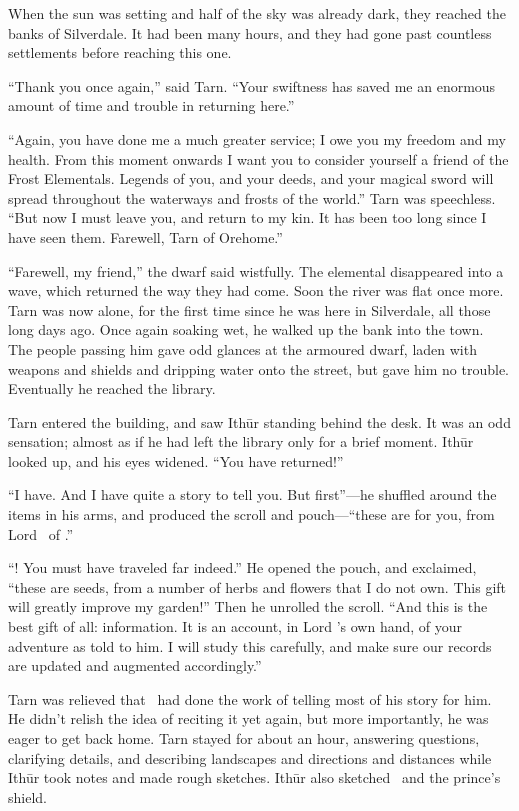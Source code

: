 When the sun was setting and half of the sky was already dark, they reached the banks of Silverdale.  It had been many hours, and they had gone past countless settlements before reaching this one.

``Thank you once again,'' said Tarn.  ``Your swiftness has saved me an enormous amount of time and trouble in returning here.''

``Again, you have done me a much greater service; I owe you my freedom and my health.  From this moment onwards I want you to consider yourself a friend of the Frost Elementals.  Legends of you, and your deeds, and your magical sword will spread throughout the waterways and frosts of the world.''  Tarn was speechless.  ``But now I must leave you, and return to my kin.  It has been too long since I have seen them.  Farewell, Tarn of Orehome.''

``Farewell, my friend,'' the dwarf said wistfully.  The elemental disappeared into a wave, which returned the way they had come.  Soon the river was flat once more.  Tarn was now alone, for the first time since he was here in Silverdale, all those long days ago.  Once again soaking wet, he walked up the bank into the town.  The people passing him gave odd glances at the armoured dwarf, laden with weapons and shields and dripping water onto the street, but gave him no trouble.  Eventually he reached the library.

Tarn entered the building, and saw Ith\=ur standing behind the desk.  It was an odd sensation; almost as if he had left the library only for a brief moment.  Ith\=ur looked up, and his eyes widened.  ``You have returned!''

``I have.  And I have quite a story to tell you.  But first''---he shuffled around the items in his arms, and produced the scroll and pouch---``these are for you, from Lord \arilor\ of \inarthonor.''

``\inarthonor!  You must have traveled far indeed.''  He opened the pouch, and exclaimed, ``these are seeds, from a number of herbs and flowers that I do not own.  This gift will greatly improve my garden!''  Then he unrolled the scroll.  ``And this is the best gift of all: information.  It is an account, in Lord \arilor's own hand, of your adventure as told to him.  I will study this carefully, and make sure our records are updated and augmented accordingly.''

Tarn was relieved that \arilor\ had done the work of telling most of his story for him.  He didn't relish the idea of reciting it yet again, but more importantly, he was eager to get back home.  Tarn stayed for about an hour, answering questions, clarifying details, and describing landscapes and directions and distances while Ith\=ur took notes and made rough sketches.  Ith\=ur also sketched \kildir\ and the prince's shield.

